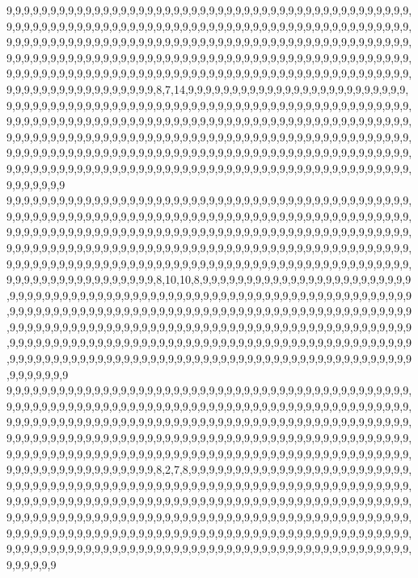9,9,9,9,9,9,9,9,9,9,9,9,9,9,9,9,9,9,9,9,9,9,9,9,9,9,9,9,9,9,9,9,9,9,9,9,9,9,9,9,9,9,9,9,9,9,9,9,9,9,9,9,9,9,9,9,9,9,9,9,9,9,9,9,9,9,9,9,9,9,9,9,9,9,9,9,9,9,9,9,9,9,9,9,9,9,9,9,9,9,9,9,9,9,9,9,9,9,9,9,9,9,9,9,9,9,9,9,9,9,9,9,9,9,9,9,9,9,9,9,9,9,9,9,9,9,9,9,9,9,9,9,9,9,9,9,9,9,9,9,9,9,9,9,9,9,9,9,9,9,9,9,9,9,9,9,9,9,9,9,9,9,9,9,9,9,9,9,9,9,9,9,9,9,9,9,9,9,9,9,9,9,9,9,9,9,9,9,9,9,9,9,9,9,9,9,9,9,9,9,9,9,9,9,9,9,9,9,9,9,9,9,9,9,9,9,9,9,9,9,9,9,9,9,9,9,9,9,9,9,9,9,9,9,9,9,9,9,9,9,9,9,9,9,9,9,9,8,7,14,9,9,9,9,9,9,9,9,9,9,9,9,9,9,9,9,9,9,9,9,9,9,9,9,9,9,9,9,9,9,9,9,9,9,9,9,9,9,9,9,9,9,9,9,9,9,9,9,9,9,9,9,9,9,9,9,9,9,9,9,9,9,9,9,9,9,9,9,9,9,9,9,9,9,9,9,9,9,9,9,9,9,9,9,9,9,9,9,9,9,9,9,9,9,9,9,9,9,9,9,9,9,9,9,9,9,9,9,9,9,9,9,9,9,9,9,9,9,9,9,9,9,9,9,9,9,9,9,9,9,9,9,9,9,9,9,9,9,9,9,9,9,9,9,9,9,9,9,9,9,9,9,9,9,9,9,9,9,9,9,9,9,9,9,9,9,9,9,9,9,9,9,9,9,9,9,9,9,9,9,9,9,9,9,9,9,9,9,9,9,9,9,9,9,9,9,9,9,9,9,9,9,9,9,9,9,9,9,9,9,9,9,9,9,9,9,9,9,9,9,9,9,9,9,9,9,9,9,9,9,9,9,9,9,9,9,9,9,9,9,9,9,9,9,9,9,9,9,9,9,9,9,9,9,9,9,9,9,9,9,9,9
9,9,9,9,9,9,9,9,9,9,9,9,9,9,9,9,9,9,9,9,9,9,9,9,9,9,9,9,9,9,9,9,9,9,9,9,9,9,9,9,9,9,9,9,9,9,9,9,9,9,9,9,9,9,9,9,9,9,9,9,9,9,9,9,9,9,9,9,9,9,9,9,9,9,9,9,9,9,9,9,9,9,9,9,9,9,9,9,9,9,9,9,9,9,9,9,9,9,9,9,9,9,9,9,9,9,9,9,9,9,9,9,9,9,9,9,9,9,9,9,9,9,9,9,9,9,9,9,9,9,9,9,9,9,9,9,9,9,9,9,9,9,9,9,9,9,9,9,9,9,9,9,9,9,9,9,9,9,9,9,9,9,9,9,9,9,9,9,9,9,9,9,9,9,9,9,9,9,9,9,9,9,9,9,9,9,9,9,9,9,9,9,9,9,9,9,9,9,9,9,9,9,9,9,9,9,9,9,9,9,9,9,9,9,9,9,9,9,9,9,9,9,9,9,9,9,9,9,9,9,9,9,9,9,9,9,9,9,9,9,9,9,9,9,9,9,9,8,10,10,8,9,9,9,9,9,9,9,9,9,9,9,9,9,9,9,9,9,9,9,9,9,9,9,9,9,9,9,9,9,9,9,9,9,9,9,9,9,9,9,9,9,9,9,9,9,9,9,9,9,9,9,9,9,9,9,9,9,9,9,9,9,9,9,9,9,9,9,9,9,9,9,9,9,9,9,9,9,9,9,9,9,9,9,9,9,9,9,9,9,9,9,9,9,9,9,9,9,9,9,9,9,9,9,9,9,9,9,9,9,9,9,9,9,9,9,9,9,9,9,9,9,9,9,9,9,9,9,9,9,9,9,9,9,9,9,9,9,9,9,9,9,9,9,9,9,9,9,9,9,9,9,9,9,9,9,9,9,9,9,9,9,9,9,9,9,9,9,9,9,9,9,9,9,9,9,9,9,9,9,9,9,9,9,9,9,9,9,9,9,9,9,9,9,9,9,9,9,9,9,9,9,9,9,9,9,9,9,9,9,9,9,9,9,9,9,9,9,9,9,9,9,9,9,9,9,9,9,9,9,9,9,9,9,9,9,9,9,9,9,9,9,9,9,9,9,9,9,9,9,9,9,9,9,9,9,9,9,9,9,9,9
9,9,9,9,9,9,9,9,9,9,9,9,9,9,9,9,9,9,9,9,9,9,9,9,9,9,9,9,9,9,9,9,9,9,9,9,9,9,9,9,9,9,9,9,9,9,9,9,9,9,9,9,9,9,9,9,9,9,9,9,9,9,9,9,9,9,9,9,9,9,9,9,9,9,9,9,9,9,9,9,9,9,9,9,9,9,9,9,9,9,9,9,9,9,9,9,9,9,9,9,9,9,9,9,9,9,9,9,9,9,9,9,9,9,9,9,9,9,9,9,9,9,9,9,9,9,9,9,9,9,9,9,9,9,9,9,9,9,9,9,9,9,9,9,9,9,9,9,9,9,9,9,9,9,9,9,9,9,9,9,9,9,9,9,9,9,9,9,9,9,9,9,9,9,9,9,9,9,9,9,9,9,9,9,9,9,9,9,9,9,9,9,9,9,9,9,9,9,9,9,9,9,9,9,9,9,9,9,9,9,9,9,9,9,9,9,9,9,9,9,9,9,9,9,9,9,9,9,9,9,9,9,9,9,9,9,9,9,9,9,9,9,9,9,9,9,9,8,2,7,8,9,9,9,9,9,9,9,9,9,9,9,9,9,9,9,9,9,9,9,9,9,9,9,9,9,9,9,9,9,9,9,9,9,9,9,9,9,9,9,9,9,9,9,9,9,9,9,9,9,9,9,9,9,9,9,9,9,9,9,9,9,9,9,9,9,9,9,9,9,9,9,9,9,9,9,9,9,9,9,9,9,9,9,9,9,9,9,9,9,9,9,9,9,9,9,9,9,9,9,9,9,9,9,9,9,9,9,9,9,9,9,9,9,9,9,9,9,9,9,9,9,9,9,9,9,9,9,9,9,9,9,9,9,9,9,9,9,9,9,9,9,9,9,9,9,9,9,9,9,9,9,9,9,9,9,9,9,9,9,9,9,9,9,9,9,9,9,9,9,9,9,9,9,9,9,9,9,9,9,9,9,9,9,9,9,9,9,9,9,9,9,9,9,9,9,9,9,9,9,9,9,9,9,9,9,9,9,9,9,9,9,9,9,9,9,9,9,9,9,9,9,9,9,9,9,9,9,9,9,9,9,9,9,9,9,9,9,9,9,9,9,9,9,9,9,9,9,9,9,9,9,9,9,9,9,9,9,9,9,9,9

